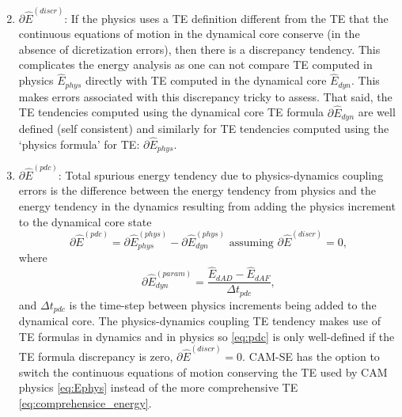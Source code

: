 \documentclass{agujournal}
\newcommand*{\gi}[1]{\widehat{#1}}
\begin{document}
\begin{enumerate}
\begin{equation}
\end{equation}
\item $\partial \gi{E}^{({discr})}$: If the physics uses a TE definition different from the TE that the continuous equations of motion in the dynamical core conserve (in the absence of dicretization errors), then there is a discrepancy tendency. This complicates the energy analysis as one can not compare TE computed in physics $\gi{E}_{phys}$ directly with TE computed in the dynamical core $\gi{E}_{dyn}$. This makes errors associated with this discrepancy tricky to assess. That said, the TE tendencies computed using the dynamical core TE formula $\partial \gi{E}_{dyn}$ are well defined (self consistent) and similarly for TE tendencies computed using the `physics formula' for TE: $\partial \gi{E}_{phys}$.


\item $\partial \gi{E}^{({pdc})}$: Total spurious energy tendency due to physics-dynamics coupling errors is the difference between the energy tendency from physics and the energy tendency in the dynamics resulting from adding the physics increment to the dynamical core state
\begin{equation}
\label{eq:pdc}
\partial \gi{E}^{({pdc})}=\partial \gi{E}_{phys}^{({phys})}-\partial \gi{E}_{dyn}^{({phys})} \text{ assuming }\partial \gi{E}^{({discr})}=0,
\end{equation}
where
\begin{equation}
\partial \gi{E}_{dyn}^{({param})}=\frac{\gi{E}_{dAD}-\gi{E}_{dAF}}{\Delta t_{pdc}},
\end{equation}
and $\Delta t_{pdc}$ is the time-step between physics increments being added to the dynamical core. The physics-dynamics coupling TE tendency makes use of TE formulas in dynamics and in physics so \eqref{eq:pdc} is only well-defined if the TE formula discrepancy is zero, $\partial \gi{E}^{({discr})}=0$. CAM-SE has the option to switch the continuous equations of motion conserving the TE used by CAM physics \eqref{eq:Ephys} instead of the more comprehensive TE \eqref{eq:comprehensice_energy}.


\end{enumerate}
\end{document}
